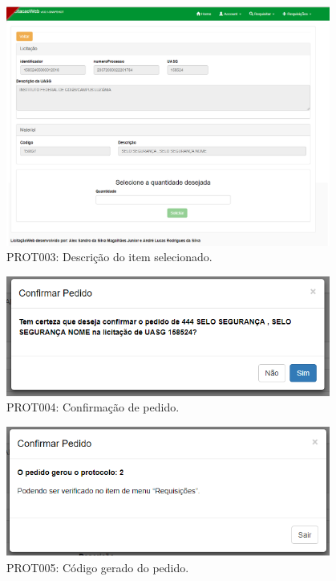 \begin{anexosenv}
\begin{figure}[htbp]
    \centering
    \includegraphics[width=0.95\textwidth]{figuras/prototipo003.png}
    \caption[PROT003: Descrição do item selecionado]{PROT003: Descrição do item selecionado.}
    \label{PROT003}
\end{figure}

\begin{figure}[htbp]
    \centering
    \includegraphics[width=0.95\textwidth]{figuras/prototipo004.png}
    \caption[PROT004: Confirmação de pedido]{PROT004: Confirmação de pedido.}
    \label{PROT004}
\end{figure}

\begin{figure}[htbp]
    \centering
    \includegraphics[width=0.95\textwidth]{figuras/prototipo005.png}
    \caption[PROT005: Código gerado do pedido]{PROT005: Código gerado do pedido.}
    \label{PROT005}
\end{figure}


\end{anexosenv}
